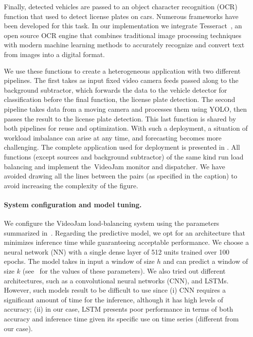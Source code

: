 Finally, detected vehicles are passed to an object character recognition (OCR) function that used to detect license plates on cars. Numerous frameworks have been developed for this task. In our implementation we integrate Tesseract~\cite{ocr}, an open source OCR engine that combines traditional image processing techniques with modern machine learning methods to accurately recognize and convert text from images into a digital format.

We use these functions to create a heterogeneous application with two different pipelines. The first takes as input fixed video camera feeds passed along to the background subtractor, which forwards the data to the vehicle detector for classification before the final function, the license plate detection. The second pipeline takes data from a moving camera and processes them using YOLO, then passes the result to the license plate detection. This last function is shared by both pipelines for reuse and optimization. With such a deployment, a situation of workload imbalance can arise at any time, and forecasting becomes more challenging. The complete application used for deployment is presented in . All functions (except sources and background subtractor) of the same kind run load balancing and implement the~VideoJam monitor and dispatcher. We have avoided drawing all the lines between the pairs (as specified in the caption) to avoid increasing the complexity of the figure.

\paragraph{System configuration and model tuning.} We configure the VideoJam load-balancing system using the parameters summarized in~. Regarding the predictive model, we opt for an architecture that minimizes inference time while guaranteeing acceptable performance. We choose a neural network (NN) with a single dense layer of 512 units trained over 100 epochs. The model takes in input a window of size $h$ and can predict a window of size $k$ (see~ for the values of these parameters). We also tried out different architectures, such as a convolutional neural networks (CNN), and LSTMs. However, such models result to be difficult to use since (i) CNN requires a significant amount of time for the inference, although it has high levels of accuracy; (ii) in our case, LSTM presents poor performance in terms of both accuracy and inference time given its specific use on time series (different from our case).

